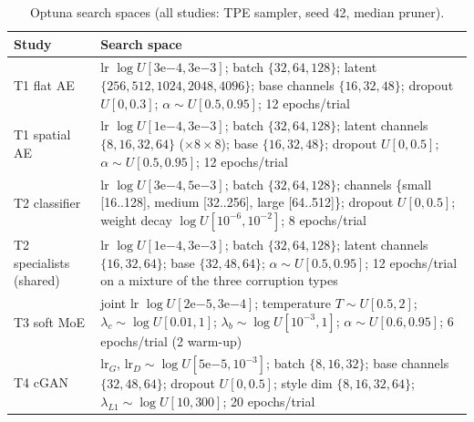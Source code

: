 \documentclass[conference]{IEEEtran}
\begin{document}
\begin{table}[t]
\caption{Optuna search spaces (all studies: TPE sampler, seed 42, median pruner).}
\label{tab:search}
\centering\footnotesize
\begin{tabular}{@{}lp{14.2cm}@{}}
\toprule
Study & Search space\\
\midrule
T1 flat AE & lr $\log U[3\mathrm{e}{-4},3\mathrm{e}{-3}]$; batch $\{32,64,128\}$; latent $\{256,512,1024,2048,4096\}$; base channels $\{16,32,48\}$; dropout $U[0,0.3]$; $\alpha\sim U[0.5,0.95]$; 12 epochs/trial\\
T1 spatial AE & lr $\log U[1\mathrm{e}{-4},3\mathrm{e}{-3}]$; batch $\{32,64,128\}$; latent channels $\{8,16,32,64\}$ ($\times 8{\times}8$); base $\{16,32,48\}$; dropout $U[0,0.5]$; $\alpha\sim U[0.5,0.95]$; 12 epochs/trial\\
T2 classifier & lr $\log U[3\mathrm{e}{-4},5\mathrm{e}{-3}]$; batch $\{32,64,128\}$; channels \{small [16..128], medium [32..256], large [64..512]\}; dropout $U[0,0.5]$; weight decay $\log U[10^{-6},10^{-2}]$; 8 epochs/trial\\
T2 specialists (shared) & lr $\log U[1\mathrm{e}{-4},3\mathrm{e}{-3}]$; batch $\{32,64,128\}$; latent channels $\{16,32,64\}$; base $\{32,48,64\}$; $\alpha\sim U[0.5,0.95]$; 12 epochs/trial on a mixture of the three corruption types\\
T3 soft MoE & joint lr $\log U[2\mathrm{e}{-5},3\mathrm{e}{-4}]$; temperature $T\sim U[0.5,2]$; $\lambda_c\sim\log U[0.01,1]$; $\lambda_b\sim\log U[10^{-3},1]$; $\alpha\sim U[0.6,0.95]$; 6 epochs/trial (2 warm-up)\\
T4 cGAN & lr$_G$, lr$_D\sim\log U[5\mathrm{e}{-5},10^{-3}]$; batch $\{8,16,32\}$; base channels $\{32,48,64\}$; dropout $U[0,0.5]$; style dim $\{8,16,32,64\}$; $\lambda_{L1}\sim\log U[10,300]$; 20 epochs/trial\\
\bottomrule
\end{tabular}
\end{table}
\end{document}
